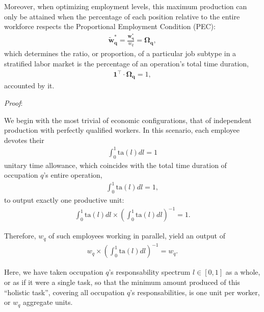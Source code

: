 \documentclass[hidelinks, nonatbib]{elsarticle}
\begin{document}
\begin{enumerate}
    Moreover, when optimizing employment levels, this maximum production can only be attained when the percentage of each position relative to the entire workforce respects the Proportional Employment Condition (PEC):
    \begin{gather}
        \boldsymbol{\tilde{w}_{q}^{*}}
        =
        \frac{
            \boldsymbol{w_{q}^{*}}
        }{
            w_q
        }
        =
        \boldsymbol{\Omega_{q}}
        ,
    \end{gather}
    which determines the ratio, or proportion, of a particular job subtype in a stratified labor market is the percentage of an operation's total time duration,
    \begin{gather}
        \boldsymbol{1} ^ {\top}
        \cdot
        \boldsymbol{\Omega_{q}}
        = 1
        ,
    \end{gather}
    accounted by it.
    
    \textit{Proof}:

    We begin with the most trivial of economic configurations, that of independent production with perfectly qualified workers. In this scenario, each employee devotes their
    \begin{gather}
        \int_{0}^{1}{
            \text{ta}(l)dl
        }
        =
        1
    \end{gather}
    unitary time allowance, which coincides with the total time duration of occupation $q$'s entire operation,
    \begin{gather}
        \int_{0}^{1}{
            \text{ta}(l)
            dl
        }
        =
        1
        ,
    \end{gather}
    to output exactly one productive unit:
    \begin{gather}
        \int_{0}^{1}{
            \text{ta}(l)dl
        }
        \times \left(
            \int_{0}^{1}{
                \text{ta}(l)dl
            }
        \right) ^ {-1}
        =
        1
        .
    \end{gather}

    Therefore, $w_q$ of such employees working in parallel, yield an output of
    \begin{align}
        w_q 
        \times 
        \left(
            \int_{0}^{1}{
                \text{ta}(l)dl
            }
        \right) ^ {-1}
        =
        w_q
        .
    \end{align}

    Here, we have taken occupation $q$'s responsability spectrum $l \in [0,1]$ as a whole, or as if it were a single task, so that the minimum amount produced of this ``holistic task'', covering all occupation $q$'s responsabilities, is one unit per worker, or $w_q$ aggregate units.


\end{enumerate}
\end{document}
